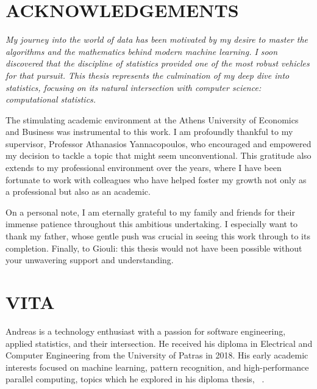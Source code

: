 \vfill

\newpage

\chapter*{ACKNOWLEDGEMENTS}

{\itshape
My journey into the world of data has been motivated by my desire to master the algorithms and the mathematics behind modern machine learning. I soon discovered that the discipline of statistics provided one of the most robust vehicles for that pursuit. This thesis represents the culmination of my deep dive into statistics, focusing on its natural intersection with computer science: computational statistics.

The stimulating academic environment at the Athens University of Economics and Business was instrumental to this work. I am profoundly thankful to my supervisor, Professor Athanasios Yannacopoulos, who encouraged and empowered my decision to tackle a topic that might seem unconventional. This gratitude also extends to my professional environment over the years, where I have been fortunate to work with colleagues who have helped foster my growth not only as a professional but also as an academic.

On a personal note, I am eternally grateful to my family and friends for their immense patience throughout this ambitious undertaking. I especially want to thank my father, whose gentle push was crucial in seeing this work through to its completion. Finally, to Giouli: this thesis would not have been possible without your unwavering support and understanding.
}

\vfill

\newpage

\chapter*{VITA}

\vfill

Andreas is a technology enthusiast with a passion for software engineering, applied statistics, and their intersection. He received his diploma in Electrical and Computer Engineering from the University of Patras in 2018. His early academic interests focused on machine learning, pattern recognition, and high-performance parallel computing, topics which he explored in his diploma thesis, ~\cite{Bampouris2018Development}.

